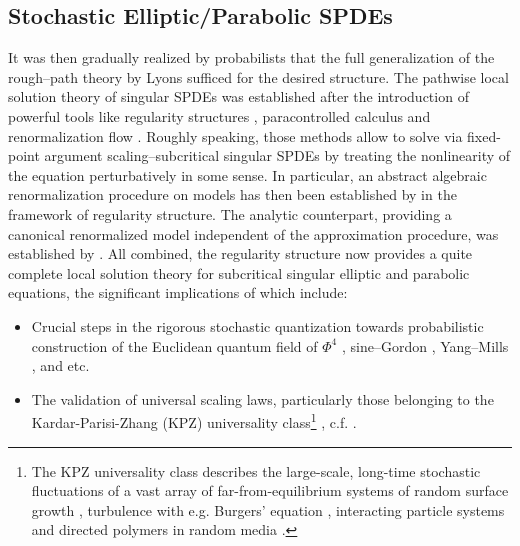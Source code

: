 \subsection{Stochastic Elliptic/Parabolic SPDEs}
It was then gradually realized by probabilists that the full generalization of the rough--path theory by Lyons \cite{Lyons1998}  sufficed for the desired structure. The pathwise local solution theory of singular SPDEs was established after the introduction of powerful tools like regularity structures {\cite{H14}}, paracontrolled calculus {\cite{GIP15}} and renormalization flow \cite{Ku16,D21}. Roughly speaking, those methods allow to solve via fixed-point argument scaling--subcritical singular SPDEs by treating the nonlinearity of the equation perturbatively in some sense. In particular, an abstract algebraic renormalization procedure on models has then been established by \cite{bruned2019algebraic} in the framework of regularity structure. The analytic counterpart, providing a canonical renormalized model independent of the approximation procedure, was established by \cite{chandrahairer2016bphz, LOTT24}. All combined, the regularity structure now provides a quite complete local solution theory for subcritical singular elliptic and parabolic equations, the significant implications of which include: 

\begin{itemize}
\item Crucial steps in the rigorous stochastic quantization \cite{ParisiWu1981} towards probabilistic construction of the Euclidean quantum field of $\Phi^4$ \cite{Shen2021,broux2025multi,duch2023parabolic,barashkov2025markovpropertyvarphi43cylinder}, sine--Gordon \cite{CHS18,gubinelli2024fbsde} , Yang--Mills  \cite{CCHS24,BS24} , and etc. 
\item The validation of universal scaling laws, particularly those belonging to the Kardar-Parisi-Zhang (KPZ) universality class\footnote{The KPZ universality class describes the large-scale, long-time stochastic fluctuations of a vast array of far-from-equilibrium systems of random surface growth \cite{Corwin2014}, turbulence with e.g. Burgers' equation \cite{Bouchaud1995, Frisch1995}, interacting particle systems \cite{huang2025scalinglimitweaklyasymmetric} and directed polymers in random media \cite{Amir2011,Corwin2014}.
} \cite{Kardar1986}, c.f. \cite{Corwin2012}. 
\end{itemize}

